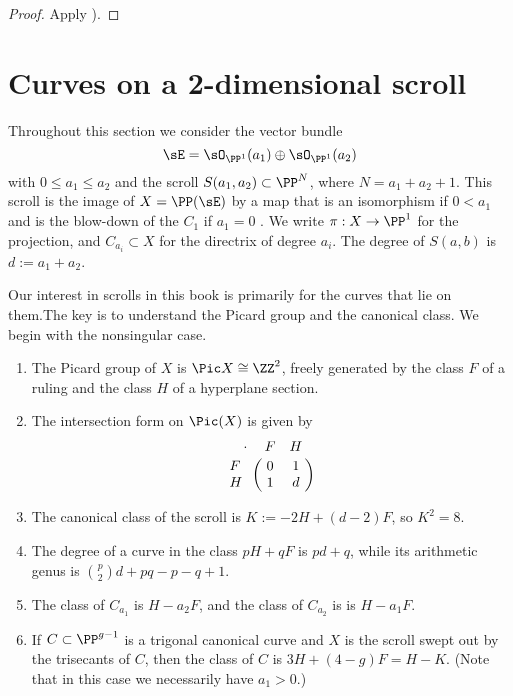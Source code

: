 \begin{proof}
Apply \cite[II.7.12]{Hartshorne1977}).
\end{proof}

\section{Curves on a 2-dimensional scroll}\label{curves on scrolls}

 Throughout this section we consider the vector bundle 
$$
\sE = \sO_{\PP^1}(a_1) \oplus\sO_{\PP^1}(a_2)
$$
with $0\leq a_1\leq a_2$ and the 
scroll $ S(a_1, a_2) \subset \PP^N$, where $N = a_1+a_2+1$. This scroll is the image of $X = \PP(\sE)$ by a map that is an isomorphism
if $0<a_1$ and is the blow-down of the $C_1$ if $a_1=0$ .  We write $\pi:X \to \PP^1$ for the projection, and
$C_{a_i}\subset X$ for the directrix of degree $a_i$. The degree of $S(a,b)$ is $d := a_1+a_2$.

Our interest in scrolls in this book is primarily for the curves that lie on them.The key is to understand the Picard group and the canonical class. We begin with the nonsingular case.

\begin{theorem}\label{pic of scroll}
\begin{enumerate} Suppose in addition that $a_{1}>0$.

\item The Picard group of $X$ is $\Pic X \cong \ZZ^2$, freely generated by  the class $F$ of a ruling and the class $H$ of a  hyperplane section. 
\item The
intersection form on $\Pic(X)$ is given by
$$
\bordermatrix{\kern 10pt\cdot&F&H\cr
F&0&1\cr
H&1&d
}
$$

\item The canonical class of the scroll is $K := -2H +(d-2)F$, so $K^2 = 8$.

\item The degree of a curve in the class $pH+qF$ is $pd+q$, while its arithmetic genus is
${p\choose 2}d+pq-p-q+1$.

\item The class of $C_{a_1}$
is $H-a_2F$, and the class of $C_{a_2}$ is 
is $H-a_1F$. 
\item If $C \subset \PP^{g-1}$ is a trigonal canonical curve and $X$ is the scroll swept out by the trisecants of $C$, then the class of $C$ is $3H+(4-g)F = H-K$. (Note that in this case we necessarily have $a_1 > 0$.)
\end{enumerate}
\end{theorem}

